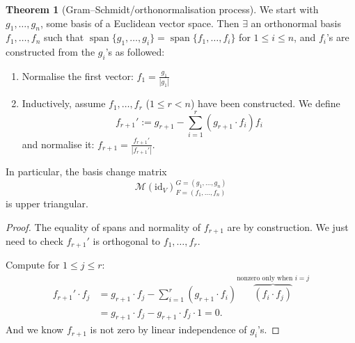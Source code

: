 \documentclass[a4paper]{article}
\newcommand{\spanset}{\operatorname{span}}
\theoremstyle{definition}
\newtheorem{thm}[defn]{Theorem}
\begin{document}
\begin{thm}[Gram--Schmidt/orthonormalisation process]
We start with $g_1,\ldots,g_n$, some basis of a Euclidean vector space. Then $\exists$ an orthonormal basis $f_1,\ldots,f_n$ such that $\spanset \{g_1,\ldots,g_i\}=\spanset \{f_1,\ldots,f_i\}$ for $1\leq i\leq n$, and $f_i$'s are constructed from the $g_i$'s as followed:
\begin{enumerate}
    \item Normalise the first vector: $f_1=\frac{g_1}{|g_1|}$
    \item Inductively, assume $f_1,\ldots,f_r$ ($1\leq r <n$) have been constructed. We define
    \[
    f_{r+1}':=g_{r+1}-\sum_{i=1}^r \left(g_{r+1}\cdot f_i \right) f_i
    \]
    and normalise it: $f_{r+1}=\frac{f_{r+1}'}{|f_{r+1}'|}$.
\end{enumerate}
In particular, the basis change matrix
\[
\mathcal M(\text{id}_V)_{F=(f_1,\ldots,f_n)}^{G=(g_1,\ldots,g_n)}
\]
is upper triangular.
\end{thm}
\begin{proof}
The equality of spans and normality of $f_{r+1}$ are by construction. We just need to check $f_{r+1}'$ is orthogonal to $f_1,\ldots,f_r$.

Compute for $1\leq j \leq r$:
\[
\begin{aligned}
f_{r+1}' \cdot f_j &= g_{r+1}\cdot f_j - \sum_{i=1}^r (g_{r+1}\cdot f_i)\overbrace{(f_i \cdot f_j)}^{\text{nonzero only when }i=j} \\
&=g_{r+1}\cdot f_j-g_{r+1}\cdot f_j \cdot 1 = 0.
\end{aligned}
\]
And we know $f_{r+1}$ is not zero by linear independence of $g_i$'s.
\end{proof}
\end{document}
